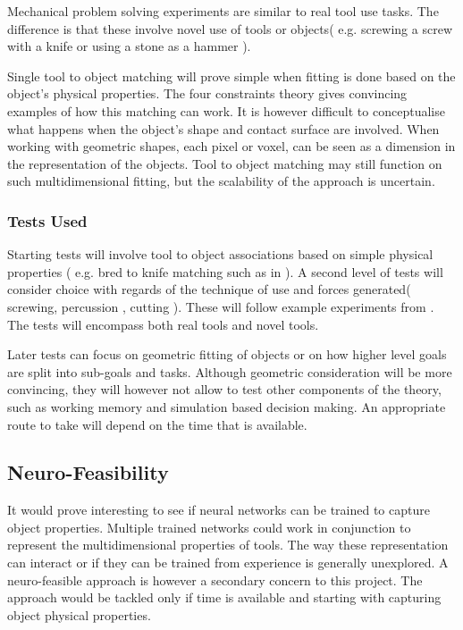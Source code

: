 \documentclass[11]{article}
\begin{document}
Mechanical problem solving experiments are similar to real tool use tasks. The difference is that these involve novel use of tools or objects( e.g. screwing a screw with a knife\cite{baumard2014} or using a stone as a hammer\cite{zhu2015} ). 

Single  tool to object matching will prove simple when fitting is done based on the object's physical properties. The four constraints theory gives convincing examples of how this matching can work. It is however difficult to conceptualise what happens when the object's shape and contact surface are involved. When working with geometric shapes, each pixel or voxel, can be seen as a dimension in the representation of the objects. Tool to object matching may still function on such multidimensional fitting, but the scalability of the approach is uncertain. 

\subsubsection*{Tests Used}

Starting tests will involve tool to object associations based on simple physical properties ( e.g. bred to knife matching such as in \cite{osiurak2014} ). A second level of tests will consider choice with regards of the technique of use and forces generated( screwing, percussion , cutting ). These will follow example experiments from \cite{zhu2015}. The tests will encompass both real tools and novel tools.  

Later tests can focus on geometric fitting of objects or on how higher level goals are split into sub-goals and tasks. Although geometric consideration will be more convincing, they will however not allow to test other components of the theory, such as working memory and simulation based decision making. An appropriate route to take will depend on the time that is available. 

\subsection*{Neuro-Feasibility}
It would prove interesting to see if neural networks can be trained to capture object properties. Multiple trained networks could work in conjunction to represent the multidimensional properties of tools. The way these representation can interact or if they can be trained from experience is generally unexplored. A neuro-feasible approach is however a secondary concern to this project. The approach would be tackled only if time is available and starting with capturing object physical properties. 
\end{document}
